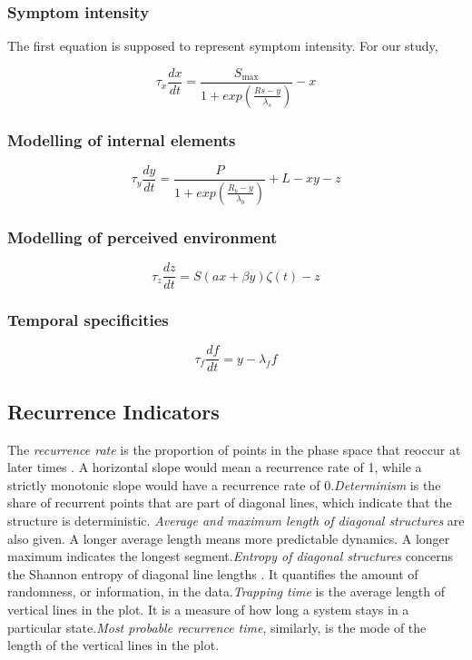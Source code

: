\documentclass[utf8]{FrontiersinVancouver}
\begin{document}
\subsubsection{Symptom intensity}
The first equation is supposed to represent symptom intensity. For our study, 

\begin{equation}
    \tau_{x}\frac{dx}{dt} = \frac{S_{\max}}{1+exp(\frac{Rs-y}{\lambda_{s}})} - x
\end{equation}


\subsubsection{Modelling of internal elements}

\begin{equation}
    \tau_{y}\frac{dy}{dt} = \frac{P}{1+exp(\frac{R_{b}-y}{\lambda_{b}})} + L - xy - z
\end{equation}

\subsubsection{Modelling of perceived environment}

\begin{equation}
    \tau_{z}\frac{dz}{dt} = S(ax + \beta y)\zeta(t) - z
\end{equation}


\subsubsection{Temporal specificities}

\begin{equation}
    \tau_f\frac{df}{dt} = y - \lambda_f f
\end{equation}

\subsection{Recurrence Indicators}

The \textit{recurrence rate} is the proportion of points in the phase space that reoccur at later times \citep{webber2005recurrence}. A horizontal slope would mean a recurrence rate of 1, while a strictly monotonic slope would have a recurrence rate of 0.\@\textit{Determinism} is the share of recurrent points that are part of diagonal lines, which indicate that the structure is deterministic. \@\textit{Average and maximum length of diagonal structures} are also given. A longer average length means more predictable dynamics. A longer maximum indicates the longest segment.\@\textit{Entropy of diagonal structures} concerns the Shannon entropy of diagonal line lengths \citep{kraemerRecurrenceThresholdSelection2018}. It quantifies the amount of randomness, or information, in the data.\@ \textit{Trapping time} is the average length of vertical lines in the plot. It is a measure of how long a system stays in a particular state.\@\textit{Most probable recurrence time}, similarly, is the mode of the length of the vertical lines in the plot. 
\end{document}
